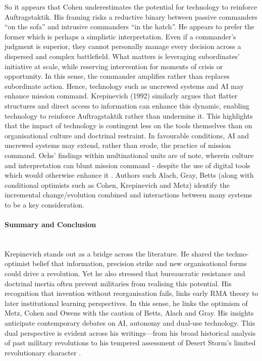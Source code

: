 So it appears that Cohen underestimates the potential for technology to reinforce Auftragstaktik. His framing risks a reductive binary between passive commanders ``on the sofa” and intrusive commanders ``in the hatch”. He appears to prefer the former which is perhaps a simplistic interpretation. Even if a commander’s judgment is superior, they cannot personally manage every decision across a dispersed and complex battlefield. What matters is leveraging subordinates’ initiative at scale, while reserving intervention for moments of crisis or opportunity. In this sense, the commander amplifies rather than replaces subordinate action. Hence, technology such as uncrewed systems and AI may enhance mission command. Krepinevich (1992) similarly argues that flatter structures and direct access to information can enhance this dynamic, enabling technology to reinforce Auftragstaktik rather than undermine it\nocite{KREP_1992}. This highlights that the impact of technology is contingent less on the tools themselves than on organisational culture and doctrinal restraint. In favourable conditions, AI and uncrewed systems may extend, rather than erode, the practice of mission command. Ochs' findings within multinational units are of note, wherein culture and interpretation can blunt mission command - despite the use of digital tools which would otherwise enhance it \parencite{OCHS_2020}. Authors such Alach, Gray, Betts (along with conditional optimists such as Cohen, Krepinevich and Metz) identify the incremental change/evolution combined and interactions between many systems to be a key consideration.

\paragraph{Summary and Conclusion}\mbox{}\\
Krepinevich stands out as a bridge across the literature. He shared the techno-optimist belief that information, precision strike and new organisational forms could drive a revolution. Yet he also stressed that bureaucratic resistance and doctrinal inertia often prevent militaries from realising this potential. His recognition that invention without reorganisation fails, links early RMA theory to later institutional learning perspectives. In this sense, he links the optimism of Metz, Cohen and Owens with the caution of Betts, Alach and Gray. His insights anticipate contemporary debates on AI, autonomy and dual-use technology. This dual perspective is evident across his writings—from his broad historical analysis of past military revolutions \parencite{KREP_1994} to his tempered assessment of Desert Storm’s limited revolutionary character \parencite{KREP_1996}.